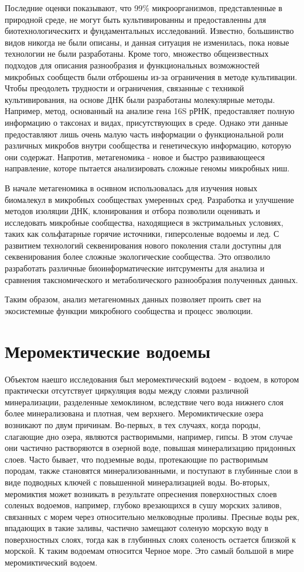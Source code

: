 Последние оценки показывают, что 99\% микроорганизмов, представленные в природной среде, не могут быть культивированны и предоставленны для биотехнологическитх и фундаментальных исследований. Известно, большинство видов никогда не были описаны, и данная ситуация не изменилась, пока новые технологии не были разработаны. Кроме того, множество общеизвестных подходов для описания разнообразия и функциональных возможностей микробных сообществ были отброшены из-за ограничения в методе культивации. Чтобы преодолеть трудности и ограничения, связанные с техникой культивирования, на основе ДНК были разработаны молекулярные методы. Например, метод, основанный на анализе гена 16S рРНК, предоставляет полную информацию о таксонах и видах, присутствующих в среде. Однако эти данные предоставляют лишь очень малую часть информации о функциональной роли различных микробов внутри сообщества и генетическую информацию, которую они содержат. Напротив, метагеномика - новое и быстро развивающееся направление, которе пытается анализировать сложные геномы микробных ниш\cite{Streit2004}.

В начале метагеномика в оснвном использовалась для изучения новых биомалекул в микробных сообществах умеренных сред. Разработка и улучшение методов изоляции ДНК, клонирования и отбора позволили оценивать и исследовать микробные сообщества, находящиеся в экстримальных условиях, таких как сольфатарные горячие источники, гиперсоленые водоемы и лед. С развитием технологий секвенирования нового поколения стали доступны для секвенирования более сложные экологические сообщества. Это опзволило разработать различные биоинформатические интсрументы для анализа и сравнения таксномического и метаболического разнообразия полученных данных. 

Таким образом, анализ метагеномных данных позволяет проить свет на экосистемные функции микробного сообщества и процесс эволюции. 

\section{Меромектические водоемы}
Объектом наешго исследования был меромектический водоем - водоем, в котором практически
отсутствует циркуляция воды между слоями различной минерализации, разделенные хемоклином, вследствие чего вода нижнего слоя более минерализована и плотная, чем верхнего.
Меромиктические озера возникают по двум причинам. Во-первых, в тех случаях, когда породы, слагающие дно озера, являются растворимыми, например, гипсы. В этом случае они
частично растворяются в озерной воде, повышая минерализацию придонных слоев. Часто
бывает, что подземные воды, протекающие по растворимым породам, также становятся минерализованными, и поступают в глубинные слои в виде подводных ключей с повышенной
минерализацией воды. Во-вторых, меромиктия может возникать в результате опреснения
поверхностных слоев соленых водоемов, например, глубоко врезающихся в сушу морских
заливов, связанных с морем через относительно мелководные проливы. Пресные воды рек, впадающих в такие заливы, частично замещают соленую морскую воду в поверхностных слоях, тогда как в глубинных слоях соленость остается близкой к морской. К таким водоемам относится Черное море. Это самый большой в мире меромиктический водоем.

